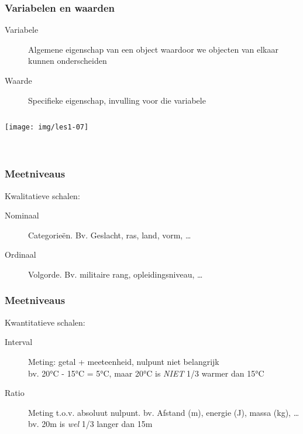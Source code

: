 \documentclass[aspectratio=169]{beamer}
\begin{document}
\begin{frame}
  \frametitle{Variabelen en waarden}

  \begin{description}
    \item[Variabele] Algemene eigenschap van een object waardoor we objecten van elkaar kunnen onderscheiden
    \item[Waarde] Specifieke eigenschap, invulling voor die variabele
  \end{description}

  \vspace{1cm}

  \begin{columns}[c]
    \centering
    \texttt{[image: img/les1-07]}

    \\
    \vspace{.5cm}
    \\
    \vspace{.5cm}

  \end{columns}
\end{frame}

\begin{frame}
  \frametitle{Meetniveaus}

  Kwalitatieve schalen:

  \begin{description}
    \item[Nominaal] Categorieën. Bv. Geslacht, ras, land, vorm, \ldots
    \item[Ordinaal] Volgorde. Bv. militaire rang, opleidingsniveau, \ldots
  \end{description}

\end{frame}

\begin{frame}
  \frametitle{Meetniveaus}

  Kwantitatieve schalen:

  \begin{description}
    \item[Interval] Meting: getal + meeteenheid, nulpunt niet belangrijk\\
      bv. 20°C - 15°C = 5°C, maar 20°C is \emph{NIET} 1/3 warmer dan 15°C
    \item[Ratio] Meting t.o.v. absoluut nulpunt. bv. Afstand (m), energie (J), massa (kg), \ldots\\
      bv. 20m is \emph{wel} 1/3 langer dan 15m
  \end{description}
\end{frame}
\end{document}

